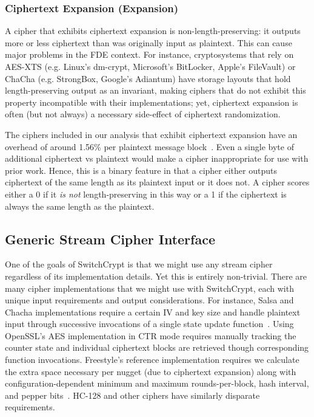 \subsubsection{Ciphertext Expansion (Expansion)}

A cipher that exhibits ciphertext expansion is non-length-preserving: it outputs
more or less ciphertext than was originally input as plaintext. This can cause
major problems in the FDE context. For instance, cryptosystems that rely on
AES-XTS (e.g. Linux's dm-crypt, Microsoft's BitLocker, Apple's FileVault) or
ChaCha (e.g. StrongBox, Google's Adiantum) have storage layouts that hold
length-preserving output as an invariant, making ciphers that do not exhibit
this property incompatible with their implementations; yet, ciphertext expansion
is often (but not always) a necessary side-effect of ciphertext randomization.

The ciphers included in our analysis that exhibit ciphertext expansion have an
overhead of around 1.56\% per plaintext message block~\cite{Freestyle}. Even a
single byte of additional ciphertext vs plaintext would make a cipher
inappropriate for use with prior work. Hence, this is a binary feature in that a
cipher either outputs ciphertext of the same length as its plaintext input or it
does not. A cipher scores either a 0 if it \emph{is not} length-preserving in
this way or a 1 if the ciphertext is always the same length as the plaintext.

\subsection{Generic Stream Cipher Interface} \label{subsec:interface}

One of the goals of SwitchCrypt is that we might use any stream cipher
regardless of its implementation details. Yet this is entirely non-trivial.
There are many cipher implementations that we might use with SwitchCrypt, each
with unique input requirements and output considerations. For instance, Salsa
and Chacha implementations require a certain IV and key size and handle
plaintext input through successive invocations of a single state update
function~\cite{Floodyberry}. Using OpenSSL's AES implementation in CTR mode
requires manually tracking the counter state and individual ciphertext blocks
are retrieved though corresponding function invocations. Freestyle's reference
implementation requires we calculate the extra space necessary per nugget (due
to ciphertext expansion) along with configuration-dependent minimum and maximum
rounds-per-block, hash interval, and pepper bits~\cite{Freestyle}. HC-128 and
other ciphers have similarly disparate requirements.

